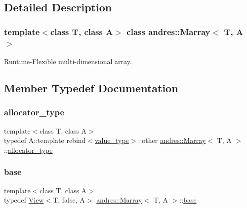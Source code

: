 \subsection{Detailed Description}
\subsubsection*{template$<$class T, class A$>$\newline
class andres\+::\+Marray$<$ T, A $>$}

Runtime-\/\+Flexible multi-\/dimensional array. 

\subsection{Member Typedef Documentation}
\mbox{\label{classandres_1_1Marray_a1e38873cb38bd8568be81bfb804deefd}} 
\subsubsection{\texorpdfstring{allocator\+\_\+type}{allocator\_type}}
{\footnotesize\ttfamily template$<$class T, class A$>$ \\
typedef A\+::template rebind$<$\hyperlink{classandres_1_1Marray_a902cba550c99fb1db7b6b95edb0ca4df}{value\+\_\+type}$>$\+::other \hyperlink{classandres_1_1Marray}{andres\+::\+Marray}$<$ T, A $>$\+::\hyperlink{classandres_1_1Marray_a1e38873cb38bd8568be81bfb804deefd}{allocator\+\_\+type}}

\mbox{\label{classandres_1_1Marray_ad954a5c638124bd4cbfdedf8fed54f0c}} 
\subsubsection{\texorpdfstring{base}{base}}
{\footnotesize\ttfamily template$<$class T, class A$>$ \\
typedef \hyperlink{classandres_1_1View}{View}$<$T, false, A$>$ \hyperlink{classandres_1_1Marray}{andres\+::\+Marray}$<$ T, A $>$\+::\hyperlink{classandres_1_1Marray_ad954a5c638124bd4cbfdedf8fed54f0c}{base}}

